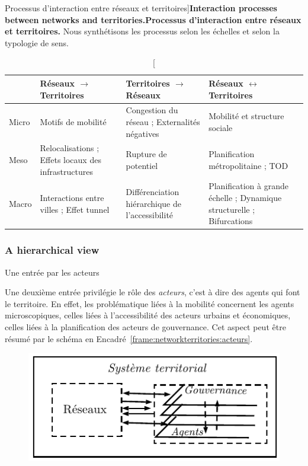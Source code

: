 \begin{table}%
\caption[Interaction processes between networks and territories][Processus d'interaction entre réseaux et territoires]{\textbf{Interaction processes between networks and territories.}\label{tab:thematic:processes}}{\textbf{Processus d'interaction entre réseaux et territoires.} Nous synthétisons les processus selon les échelles et selon la typologie de sens.\label{tab:thematic:processes}}
\begin{tabular}{|l|p{5cm}|p{5cm}|p{5cm}|}
\hline
 & Réseaux $\rightarrow$ Territoires & Territoires $\rightarrow$ Réseaux & Réseaux $\leftrightarrow$ Territoires\\ \hline
Micro & Motifs de mobilité & Congestion du réseau ; Externalités négatives & Mobilité et structure sociale \\ \hline
Meso & Relocalisations ; Effets locaux des infrastructures & Rupture de potentiel & Planification métropolitaine ; TOD \\ \hline
Macro & Interactions entre villes ; Effet tunnel & Différenciation hiérarchique de l'accessibilité & Planification à grande échelle ; Dynamique structurelle ; Bifurcations\\ \hline
\end{tabular}
\end{table}



\subsubsection*{A hierarchical view}{Une entrée par les acteurs}


Une deuxième entrée privilégie le rôle des \emph{acteurs}, c'est à dire des agents qui font le territoire. En effet, les problématique liées à la mobilité concernent les agents microscopiques, celles liées à l'accessibilité des acteurs urbains et économiques, celles liées à la planification des acteurs de gouvernance. Cet aspect peut être résumé par le schéma en Encadré~\ref{frame:networkterritories:acteurs}.


\begin{figure}[h!]
\begin{mdframed}
\includegraphics[width=\textwidth]{Figures/Theory/processes_acteurs}
\medskip
{}
\end{mdframed}
\end{figure}


